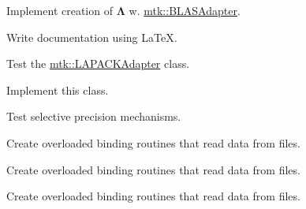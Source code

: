 \begin{DoxyRefList}
Implement creation of $ \mathbf{\Lambda}$ w. \hyperlink{classmtk_1_1BLASAdapter}{mtk\+::\+B\+L\+A\+S\+Adapter}.  
\item[\label{todo__todo000024}%
\hypertarget{todo__todo000024}{}%
File \hyperlink{mtk__lapack__adapter_8cc}{mtk\+\_\+lapack\+\_\+adapter.cc} ]Write documentation using La\+Te\+X. 
\item[\label{todo__todo000032}%
\hypertarget{todo__todo000032}{}%
File \hyperlink{mtk__lapack__adapter__test_8cc}{mtk\+\_\+lapack\+\_\+adapter\+\_\+test.cc} ]Test the \hyperlink{classmtk_1_1LAPACKAdapter}{mtk\+::\+L\+A\+P\+A\+C\+K\+Adapter} class.  
\item[\label{todo__todo000003}%
\hypertarget{todo__todo000003}{}%
File \hyperlink{mtk__quad__1d_8h}{mtk\+\_\+quad\+\_\+1d.h} ]Implement this class.  
\item[\label{todo__todo000004}%
\hypertarget{todo__todo000004}{}%
File \hyperlink{mtk__roots_8h}{mtk\+\_\+roots.h} ]Test selective precision mechanisms.  
\item[\label{todo__todo000005}%
\hypertarget{todo__todo000005}{}%
File \hyperlink{mtk__uni__stg__grid__1d_8h}{mtk\+\_\+uni\+\_\+stg\+\_\+grid\+\_\+1d.h} ]Create overloaded binding routines that read data from files.  
\item[\label{todo__todo000008}%
\hypertarget{todo__todo000008}{}%
File \hyperlink{mtk__uni__stg__grid__2d_8h}{mtk\+\_\+uni\+\_\+stg\+\_\+grid\+\_\+2d.h} ]Create overloaded binding routines that read data from files.  
\item[\label{todo__todo000011}%
\hypertarget{todo__todo000011}{}%
File \hyperlink{mtk__uni__stg__grid__3d_8h}{mtk\+\_\+uni\+\_\+stg\+\_\+grid\+\_\+3d.h} ]Create overloaded binding routines that read data from files. 
\end{DoxyRefList}